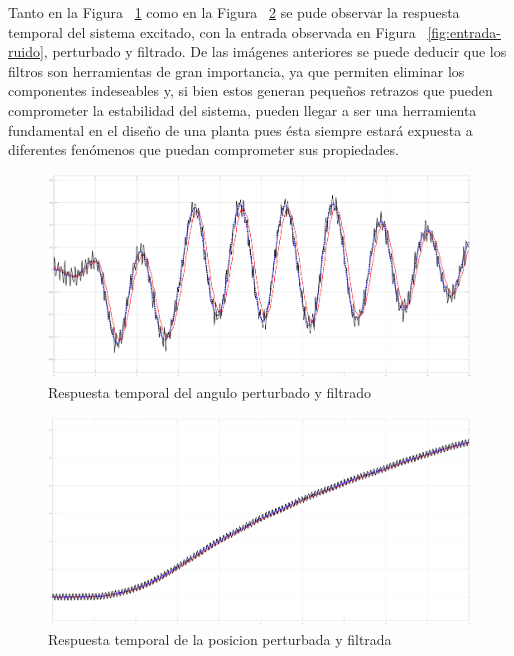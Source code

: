 Tanto en la Figura ~\ref{fig:filtro-angle} como en la Figura ~\ref{fig:filtro-c} se pude observar la
respuesta temporal del sistema excitado, con la entrada observada
en Figura ~\ref{fig:entrada-ruido}, perturbado y filtrado. De las imágenes anteriores se puede deducir que los filtros son herramientas de gran importancia, ya que
permiten eliminar los componentes indeseables y, si bien estos generan pequeños retrazos que pueden comprometer
la estabilidad del sistema, pueden llegar a ser una herramienta fundamental en el diseño de una planta
pues ésta siempre estará expuesta a diferentes fenómenos que puedan comprometer sus propiedades.


\begin{figure}[t]
  \label{fig:filtro-angle}
  \includegraphics[scale=0.15]{Figuras/filtro-angle}
  \caption{Respuesta temporal del angulo perturbado y filtrado} 
\end{figure}

\begin{figure}[t]
  \label{fig:filtro-c}
  \includegraphics[scale=0.15]{Figuras/filtro-c}
  \caption{Respuesta temporal de la posicion perturbada y filtrada} 
\end{figure}
